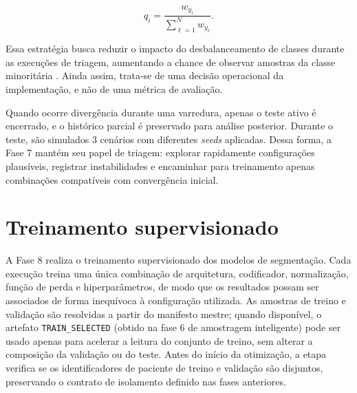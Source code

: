 \begin{equation}
    q_i =
    \frac{w_{y_i}}{\sum_{\ell=1}^{N} w_{y_\ell}} .
    \label{eq:weighted_sampler}
\end{equation}

Essa estratégia busca reduzir o impacto do desbalanceamento de classes durante
as execuções de triagem, aumentando a chance de observar amostras da classe
minoritária \cite{he2009imbalanced}. Ainda assim, trata-se de uma decisão
operacional da implementação, e não de uma métrica de avaliação.

Quando ocorre divergência durante uma varredura, apenas o teste ativo é encerrado, e o histórico parcial é preservado para análise posterior. Durante o teste, são simulados 3 cenários com diferentes \textit{seeds} aplicadas. Dessa forma, a Fase 7 mantém seu papel de triagem: explorar rapidamente configurações plausíveis, registrar instabilidades e encaminhar para treinamento apenas combinações compatíveis com convergência inicial.

\section{Treinamento supervisionado}\label{sec:met_treinamento}

A Fase 8 realiza o treinamento supervisionado dos modelos de segmentação. Cada
execução treina uma única combinação de arquitetura, codificador, normalização,
função de perda e hiperparâmetros, de modo que os resultados possam ser
associados de forma inequívoca à configuração utilizada. As amostras de treino e
validação são resolvidas a partir do manifesto mestre; quando disponível, o
artefato \texttt{TRAIN\_SELECTED} (obtido na fase 6 de amostragem inteligente)  pode ser usado apenas para acelerar a leitura
do conjunto de treino, sem alterar a composição da validação ou do teste. Antes
do início da otimização, a etapa verifica se os identificadores de paciente de
treino e validação são disjuntos, preservando o contrato de isolamento definido
nas fases anteriores.

